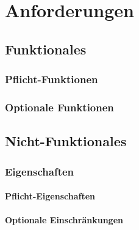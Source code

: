 ﻿%
%


\chapter{Anforderungen}
\label{Anforderungen}


\section{Funktionales}

\subsection{Pflicht-Funktionen}

\subsection{Optionale Funktionen}

\section{Nicht-Funktionales}

\subsection{Eigenschaften}

\subsubsection{Pflicht-Eigenschaften}

\subsubsection{Optionale Einschränkungen}

%
%
%

